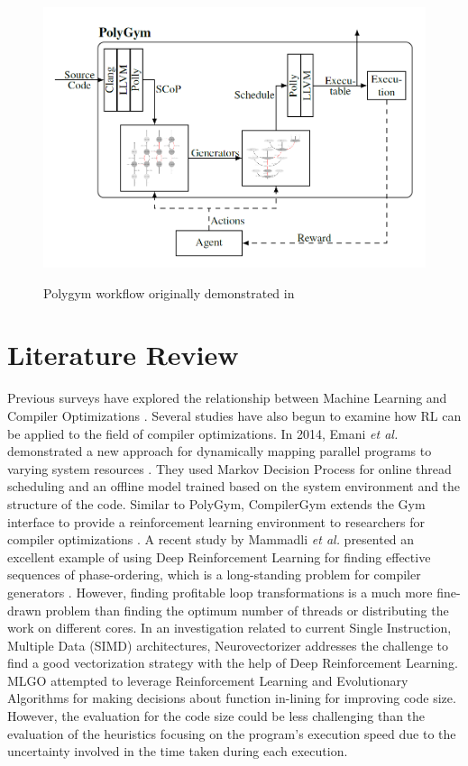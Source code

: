 \documentclass[logo,msc]{infthesis}           %
\begin{document}
\begin{figure}[htbp]
  \centering
  \includegraphics[width=\textwidth]{Images/PolyGym.png}
  \label{fig:polygym}  
  \caption{Polygym workflow originally demonstrated in \cite{P1}}
\end{figure}

\section{Literature Review}

Previous surveys have explored the relationship between Machine Learning and Compiler Optimizations \cite{8357388}\cite{9232934}. Several studies have also begun to examine how RL can be applied to the field of compiler optimizations. In 2014, Emani \textit{et al.} demonstrated a new approach for dynamically mapping parallel programs to varying system resources \cite{10.1007}. They used Markov Decision Process for online thread scheduling and an offline model trained based on the system environment and the structure of the code. Similar to PolyGym, CompilerGym extends the Gym interface to provide a reinforcement learning environment to researchers for compiler optimizations \cite{CompilerGym}. A recent study by Mammadli \textit{et al.} presented an excellent example of using Deep Reinforcement Learning for finding effective sequences of phase-ordering, which is a long-standing problem for compiler generators \cite{static.neural}. However, finding profitable loop transformations is a much more fine-drawn problem than finding the optimum number of threads or distributing the work on different cores. In an investigation related to current Single Instruction, Multiple Data (SIMD) architectures, Neurovectorizer \cite{NeuroVectorizer} addresses the challenge to find a good vectorization strategy with the help of Deep Reinforcement Learning. MLGO \cite{10.48550} attempted to leverage Reinforcement Learning and Evolutionary Algorithms for making decisions about function in-lining for improving code size. However, the evaluation for the code size could be less challenging than the evaluation of the heuristics focusing on the program's execution speed due to the uncertainty involved in the time taken during each execution.
\end{document}
